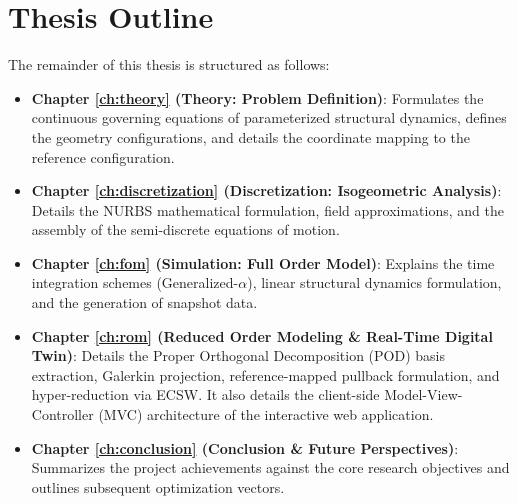 \section{Thesis Outline}
The remainder of this thesis is structured as follows:
\begin{itemize}
    \item \textbf{Chapter \ref{ch:theory} (Theory: Problem Definition)}: Formulates the continuous governing equations of parameterized structural dynamics, defines the geometry configurations, and details the coordinate mapping to the reference configuration.
    \item \textbf{Chapter \ref{ch:discretization} (Discretization: Isogeometric Analysis)}: Details the NURBS mathematical formulation, field approximations, and the assembly of the semi-discrete equations of motion.
    \item \textbf{Chapter \ref{ch:fom} (Simulation: Full Order Model)}: Explains the time integration schemes (Generalized-$\alpha$), linear structural dynamics formulation, and the generation of snapshot data.
    \item \textbf{Chapter \ref{ch:rom} (Reduced Order Modeling \& Real-Time Digital Twin)}: Details the Proper Orthogonal Decomposition (POD) basis extraction, Galerkin projection, reference-mapped pullback formulation, and hyper-reduction via ECSW. It also details the client-side Model-View-Controller (MVC) architecture of the interactive web application.
    \item \textbf{Chapter \ref{ch:conclusion} (Conclusion \& Future Perspectives)}: Summarizes the project achievements against the core research objectives and outlines subsequent optimization vectors.
\end{itemize}
